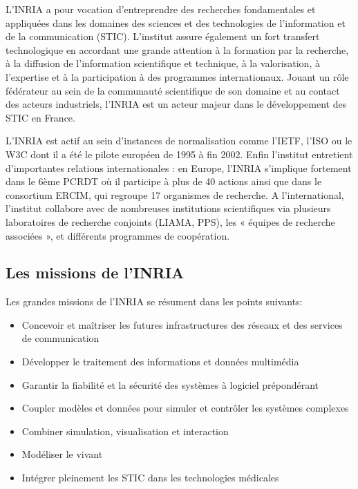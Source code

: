 \documentclass[a4paper, 11pt]{report}
\begin{document}
    L’INRIA a pour vocation d’entreprendre des recherches fondamentales et
    appliquées dans les domaines des sciences et des technologies de l’information
    et de la communication (STIC). L’institut assure également un fort
    transfert technologique en accordant une grande attention à la formation
    par la recherche, à la diffusion de l’information scientifique et
    technique, à la valorisation, à l’expertise et à la participation à des
    programmes internationaux. Jouant un rôle fédérateur au sein de la
    communauté scientifique de son domaine et au contact des acteurs
    industriels, l’INRIA est un acteur majeur dans le développement des STIC en
    France.

    L’INRIA est actif au sein d’instances de normalisation comme l’IETF,
    l’ISO ou le W3C dont il a été le pilote européen de 1995 à fin 2002.
    Enfin l’institut entretient d’importantes relations internationales : en
    Europe, l’INRIA s’implique fortement dans le 6ème PCRDT où il participe
    à plus de 40 actions ainsi que dans le consortium ERCIM, qui regroupe 17
    organismes de recherche. A l’international, l’institut collabore avec de
    nombreuses institutions scientifiques via plusieurs laboratoires de
    recherche conjoints (LIAMA, PPS), les « équipes de recherche associées »,
    et différents programmes de coopération.

    \subsection{Les missions de l'INRIA}
    Les grandes missions de l'INRIA se résument dans les points suivants:
    \begin{itemize}
     \item Concevoir et maîtriser les futures infrastructures des réseaux et
     des services de communication
     \item Développer le traitement des informations et données multimédia
     \item Garantir la fiabilité et la sécurité des systèmes à logiciel
     prépondérant
     \item Coupler modèles et données pour simuler et contrôler les systèmes
     complexes
     \item Combiner simulation, visualisation et interaction
     \item Modéliser le vivant
     \item Intégrer pleinement les STIC dans les technologies médicales
    \end{itemize}
\end{document}
